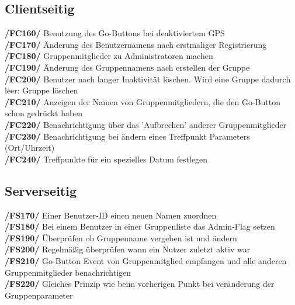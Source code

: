 \subsection{Clientseitig}
     \textbf{/FC160/} Benutzung des Go-Buttons bei deaktiviertem GPS\\
     \textbf{/FC170/} Änderung des Benutzernamens nach erstmaliger Registrierung\\
     \textbf{/FC180/} Gruppenmitglieder zu Administratoren machen                \\
     \textbf{/FC190/} Änderung des Gruppennamens nach erstellen der Gruppe        \\
     \textbf{/FC200/} Benutzer nach langer Inaktivität löschen. Wird eine Gruppe dadurch leer: Gruppe löschen\\
     \textbf{/FC210/} Anzeigen der Namen von Gruppenmitgliedern, die den Go-Button schon gedrückt haben\\
     \textbf{/FC220/} Benachrichtigung über das 'Aufbrechen' anderer Gruppenmitglieder\\
     \textbf{/FC230/} Benachrichtigung bei ändern eines Treffpunkt Parameters (Ort/Uhrzeit)\\
     \textbf{/FC240/} Treffpunkte für ein spezielles Datum festlegen\\
\subsection{Serverseitig}
     \textbf{/FS170/} Einer Benutzer-ID einen neuen Namen zuordnen\\
     \textbf{/FS180/} Bei einem Benutzer in einer Gruppenliste das Admin-Flag setzen\\
     \textbf{/FS190/} Überprüfen ob Gruppenname vergeben ist und ändern\\
     \textbf{/FS200/} Regelmäßig überprüfen wann ein Nutzer zuletzt aktiv war\\
     \textbf{/FS210/} Go-Button Event von Gruppenmitglied empfangen und alle anderen Gruppenmitglieder benachrichtigen\\
     \textbf{/FS220/} Gleiches Prinzip wie beim vorherigen Punkt bei veränderung der Gruppenparameter\\

